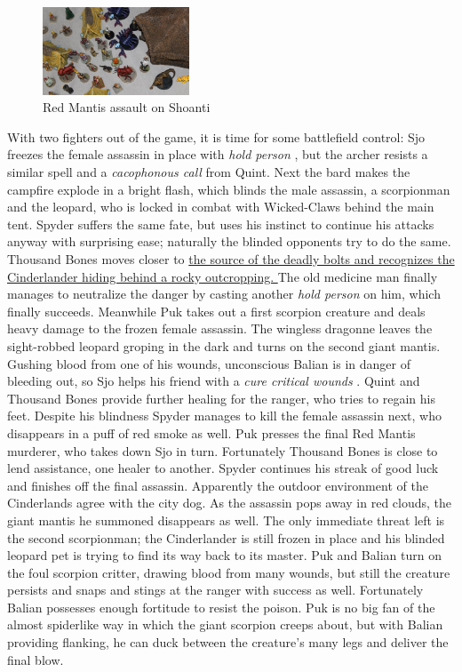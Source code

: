 \begin{figure}[h]
	\centering
	\includegraphics[width=0.39\textwidth]{images/Red-Mantis-assault-on-Shoanti-603326119.jpg}
	\caption{Red Mantis assault on Shoanti}
	\label{fig:Red-Mantis-assault-on-Shoanti-603326119}
\end{figure}

With two fighters out of the game, it is time for some battlefield control: Sjo freezes the female assassin in place with {\itshape hold person} , but the archer resists a similar spell and a  {\itshape cacophonous call} from Quint. Next the bard makes the campfire explode in a bright flash, which blinds the male assassin, a scorpionman and the leopard, who is locked in combat with Wicked-Claws behind the main tent. Spyder suffers the same fate, but uses his instinct to continue his attacks anyway with surprising ease; naturally the blinded opponents try to do the same. Thousand Bones moves closer to \hyperref[fig:The-Cinderlander-from-Curse-of-the-Crimson-Throne-603327133]{ the source of the deadly bolts and recognizes the Cinderlander hiding behind a rocky outcropping. } The old medicine man finally manages to neutralize the danger by casting another  {\itshape hold person} on him, which finally succeeds. Meanwhile Puk takes out a first scorpion creature and deals heavy damage to the frozen female assassin. The wingless dragonne leaves the sight-robbed leopard groping in the dark and turns on the second giant mantis. Gushing blood from one of his wounds, unconscious Balian is in danger of bleeding out, so Sjo helps his friend with a  {\itshape cure critical wounds} . Quint and Thousand Bones provide further healing for the ranger, who tries to regain his feet. Despite his blindness Spyder manages to kill the female assassin next, who disappears in a puff of red smoke as well. Puk presses the final Red Mantis murderer, who takes down Sjo in turn. Fortunately Thousand Bones is close to lend assistance, one healer to another. Spyder continues his streak of good luck and finishes off the final assassin. Apparently the outdoor environment of the Cinderlands agree with the city dog. As the assassin pops away in red clouds, the giant mantis he summoned disappears as well. The only immediate threat left is the second scorpionman; the Cinderlander is still frozen in place and his blinded leopard pet is trying to find its way back to its master. Puk and Balian turn on the foul scorpion critter, drawing blood from many wounds, but still the creature persists and snaps and stings at the ranger with success as well. Fortunately Balian possesses enough fortitude to resist the poison. Puk is no big fan of the almost spiderlike way in which the giant scorpion creeps about, but with Balian providing flanking, he can duck between the creature's many legs and deliver the final blow. \\


